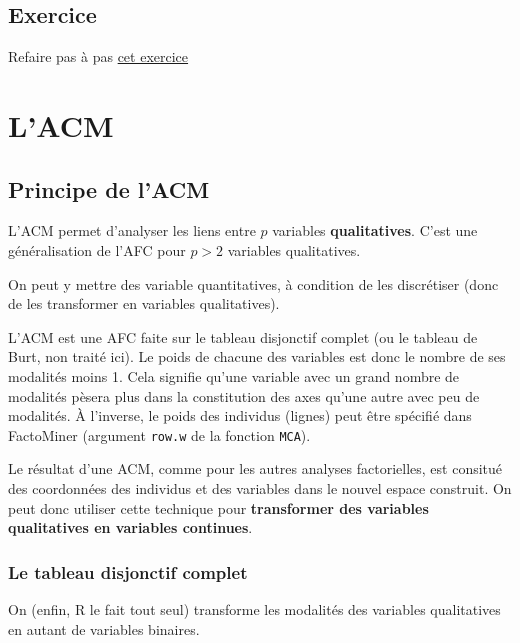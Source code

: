 \documentclass[]{book}
\begin{document}
\hypertarget{exercice-1}{%
\section{Exercice}\label{exercice-1}}

Refaire pas à pas \href{http://www.sthda.com/french/articles/38-methodes-des-composantes-principales-dans-r-guide-pratique/74-afc-analyse-factorielle-des-correspondances-avec-r-l-essentiel/}{cet exercice}

\hypertarget{lacm}{%
\chapter{L'ACM}\label{lacm}}

\hypertarget{principe-de-lacm}{%
\section{Principe de l'ACM}\label{principe-de-lacm}}

L'ACM permet d'analyser les liens entre \(p\) variables \textbf{qualitatives}. C'est une généralisation de l'AFC pour \(p > 2\) variables qualitatives.

On peut y mettre des variable quantitatives, à condition de les discrétiser (donc de les transformer en variables qualitatives).

L'ACM est une AFC faite sur le tableau disjonctif complet (ou le tableau de Burt, non traité ici). Le poids de chacune des variables est donc le nombre de ses modalités moins 1. Cela signifie qu'une variable avec un grand nombre de modalités pèsera plus dans la constitution des axes qu'une autre avec peu de modalités. À l'inverse, le poids des individus (lignes) peut être spécifié dans FactoMiner (argument \texttt{row.w} de la fonction \texttt{MCA}).

Le résultat d'une ACM, comme pour les autres analyses factorielles, est consitué des coordonnées des individus et des variables dans le nouvel espace construit. On peut donc utiliser cette technique pour \textbf{transformer des variables qualitatives en variables continues}.

\hypertarget{le-tableau-disjonctif-complet}{%
\subsection{Le tableau disjonctif complet}\label{le-tableau-disjonctif-complet}}

On (enfin, R le fait tout seul) transforme les modalités des variables qualitatives en autant de variables binaires.
\end{document}
